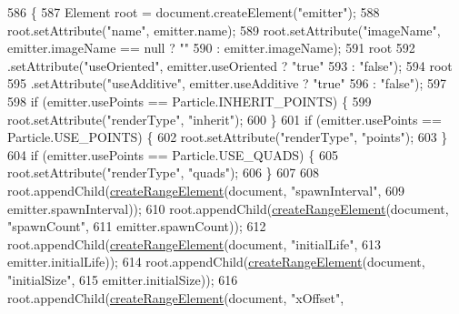 \begin{DoxyCode}
586                                          \{
587         Element root = document.createElement(\textcolor{stringliteral}{"emitter"});
588         root.setAttribute(\textcolor{stringliteral}{"name"}, emitter.name);
589         root.setAttribute(\textcolor{stringliteral}{"imageName"}, emitter.imageName == null ? \textcolor{stringliteral}{""}
590                 : emitter.imageName);
591         root
592                 .setAttribute(\textcolor{stringliteral}{"useOriented"}, emitter.useOriented ? \textcolor{stringliteral}{"true"}
593                         : \textcolor{stringliteral}{"false"});
594         root
595                 .setAttribute(\textcolor{stringliteral}{"useAdditive"}, emitter.useAdditive ? \textcolor{stringliteral}{"true"}
596                         : \textcolor{stringliteral}{"false"});
597 
598         \textcolor{keywordflow}{if} (emitter.usePoints == Particle.INHERIT\_POINTS) \{
599             root.setAttribute(\textcolor{stringliteral}{"renderType"}, \textcolor{stringliteral}{"inherit"});
600         \}
601         \textcolor{keywordflow}{if} (emitter.usePoints == Particle.USE\_POINTS) \{
602             root.setAttribute(\textcolor{stringliteral}{"renderType"}, \textcolor{stringliteral}{"points"});
603         \}
604         \textcolor{keywordflow}{if} (emitter.usePoints == Particle.USE\_QUADS) \{
605             root.setAttribute(\textcolor{stringliteral}{"renderType"}, \textcolor{stringliteral}{"quads"});
606         \}
607 
608         root.appendChild(\mbox{\hyperlink{classorg_1_1newdawn_1_1slick_1_1particles_1_1_particle_i_o_a9c35ea6edbfd626b65a23b87517c323d}{createRangeElement}}(document, \textcolor{stringliteral}{"spawnInterval"},
609                 emitter.spawnInterval));
610         root.appendChild(\mbox{\hyperlink{classorg_1_1newdawn_1_1slick_1_1particles_1_1_particle_i_o_a9c35ea6edbfd626b65a23b87517c323d}{createRangeElement}}(document, \textcolor{stringliteral}{"spawnCount"},
611                 emitter.spawnCount));
612         root.appendChild(\mbox{\hyperlink{classorg_1_1newdawn_1_1slick_1_1particles_1_1_particle_i_o_a9c35ea6edbfd626b65a23b87517c323d}{createRangeElement}}(document, \textcolor{stringliteral}{"initialLife"},
613                 emitter.initialLife));
614         root.appendChild(\mbox{\hyperlink{classorg_1_1newdawn_1_1slick_1_1particles_1_1_particle_i_o_a9c35ea6edbfd626b65a23b87517c323d}{createRangeElement}}(document, \textcolor{stringliteral}{"initialSize"},
615                 emitter.initialSize));
616         root.appendChild(\mbox{\hyperlink{classorg_1_1newdawn_1_1slick_1_1particles_1_1_particle_i_o_a9c35ea6edbfd626b65a23b87517c323d}{createRangeElement}}(document, \textcolor{stringliteral}{"xOffset"},

\end{DoxyCode}
